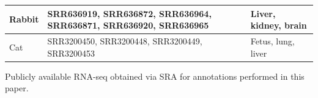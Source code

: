 \documentclass[fleqn,10pt]{wlscirep}
\begin{document}
\begin{center}
\begin{longtable}{|p{}|p{}|p{}|}
Rabbit    & SRR636919, SRR636872, SRR636964, SRR636871, SRR636920, SRR636965                                                                                                                                                                                                                                                                                                                                                                               &          Liver, kidney, brain                                                                                                             \\ \hline
Cat       & SRR3200450, SRR3200448, SRR3200449, SRR3200453                                                                                                                                                                                                                                                                                                                                                                                                 &      Fetus, lung, liver                                                        \\ \hline                           
\end{longtable}
Publicly available RNA-seq obtained via SRA for annotations performed in this paper. 
\end{center}
\end{document}
